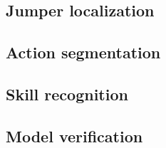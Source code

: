 
\chapter{}%
\label{ch:results}


\section{Jumper localization}

\section{Action segmentation}

\section{Skill recognition}

\section{Model verification}
